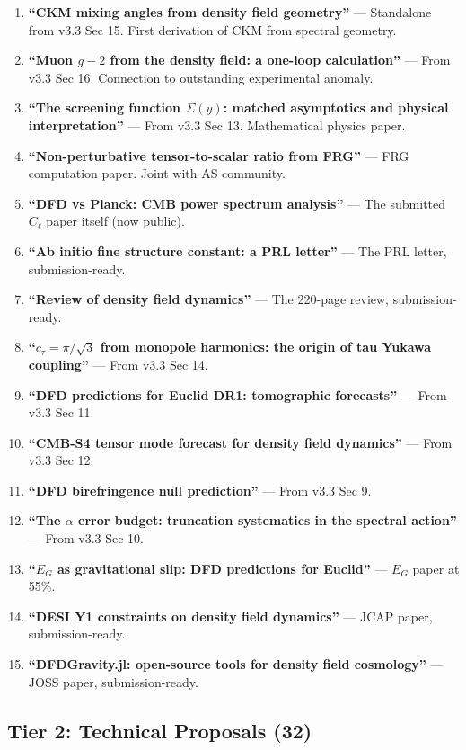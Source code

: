 \documentclass[11pt,a4paper]{article}
\begin{document}
\begin{enumerate}[nosep]
\item \textbf{``CKM mixing angles from density field geometry''} --- Standalone from v3.3 Sec 15. First derivation of CKM from spectral geometry.
\item \textbf{``Muon $g-2$ from the density field: a one-loop calculation''} --- From v3.3 Sec 16. Connection to outstanding experimental anomaly.
\item \textbf{``The screening function $\Sigma(y)$: matched asymptotics and physical interpretation''} --- From v3.3 Sec 13. Mathematical physics paper.
\item \textbf{``Non-perturbative tensor-to-scalar ratio from FRG''} --- FRG computation paper. Joint with AS community.
\item \textbf{``DFD vs Planck: CMB power spectrum analysis''} --- The submitted $C_\ell$ paper itself (now public).
\item \textbf{``Ab initio fine structure constant: a PRL letter''} --- The PRL letter, submission-ready.
\item \textbf{``Review of density field dynamics''} --- The 220-page review, submission-ready.
\item \textbf{``$c_\tau = \pi/\sqrt{3}$ from monopole harmonics: the origin of tau Yukawa coupling''} --- From v3.3 Sec 14.
\item \textbf{``DFD predictions for Euclid DR1: tomographic forecasts''} --- From v3.3 Sec 11.
\item \textbf{``CMB-S4 tensor mode forecast for density field dynamics''} --- From v3.3 Sec 12.
\item \textbf{``DFD birefringence null prediction''} --- From v3.3 Sec 9.
\item \textbf{``The $\alpha$ error budget: truncation systematics in the spectral action''} --- From v3.3 Sec 10.
\item \textbf{``$E_G$ as gravitational slip: DFD predictions for Euclid''} --- $E_G$ paper at 55\%.
\item \textbf{``DESI Y1 constraints on density field dynamics''} --- JCAP paper, submission-ready.
\item \textbf{``DFDGravity.jl: open-source tools for density field cosmology''} --- JOSS paper, submission-ready.
\end{enumerate}

\subsection{Tier 2: Technical Proposals (32)}
\end{document}
